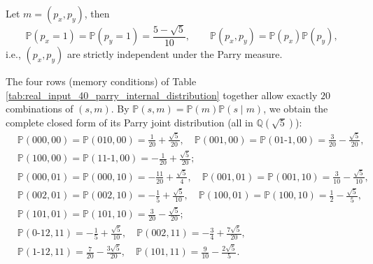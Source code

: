 \begin{corollary}\label{cor:real-input-40-memory-independence}
Let $m=(p_x,p_y)$, then
\[
\mathbb{P}(p_x=1)=\mathbb{P}(p_y=1)=\frac{5-\sqrt5}{10},
\qquad
\mathbb{P}(p_x,p_y)=\mathbb{P}(p_x)\mathbb{P}(p_y),
\]
i.e., $(p_x,p_y)$ are strictly independent under the Parry measure.
\end{corollary}

\begin{remark}\label{rem:real-input-40-parry-essential-20-joint}
The four rows (memory conditions) of Table \ref{tab:real_input_40_parry_internal_distribution} together allow exactly $20$ combinations of $(s,m)$.
By $\mathbb{P}(s,m)=\mathbb{P}(m)\mathbb{P}(s\mid m)$, we obtain the complete closed form of its Parry joint distribution (all in $\mathbb{Q}(\sqrt5)$):
\[
\begin{aligned}
&\mathbb{P}(000,00)=\mathbb{P}(010,00)=\frac{1}{20}+\frac{\sqrt5}{20},\quad
\mathbb{P}(001,00)=\mathbb{P}(01\text{-}1,00)=\frac{3}{20}-\frac{\sqrt5}{20},\\
&\mathbb{P}(100,00)=\mathbb{P}(11\text{-}1,00)=-\frac{1}{20}+\frac{\sqrt5}{20};\\[2pt]
&\mathbb{P}(000,01)=\mathbb{P}(000,10)=-\frac{11}{20}+\frac{\sqrt5}{4},\quad
\mathbb{P}(001,01)=\mathbb{P}(001,10)=\frac{3}{10}-\frac{\sqrt5}{10},\\
&\mathbb{P}(002,01)=\mathbb{P}(002,10)=-\frac15+\frac{\sqrt5}{10},\quad
\mathbb{P}(100,01)=\mathbb{P}(100,10)=\frac12-\frac{\sqrt5}{5},\\
&\mathbb{P}(101,01)=\mathbb{P}(101,10)=\frac{3}{20}-\frac{\sqrt5}{20};\\[2pt]
&\mathbb{P}(0\text{-}12,11)=-\frac15+\frac{\sqrt5}{10},\quad
\mathbb{P}(002,11)=-\frac34+\frac{7\sqrt5}{20},\\
&\mathbb{P}(1\text{-}12,11)=\frac7{20}-\frac{3\sqrt5}{20},\quad
\mathbb{P}(101,11)=\frac9{10}-\frac{2\sqrt5}{5}.
\end{aligned}
\]
\end{remark}

